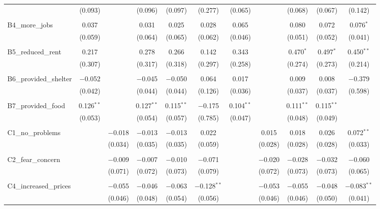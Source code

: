 \begin{table}[H]
\begin{tabular}{@{\extracolsep{4pt}}lcccccccccc}
  & (0.093) &  & (0.096) & (0.097) & (0.277) & (0.065) &  & (0.068) & (0.067) & (0.142) \\ 
  & & & & & & & & & & \\ 
 B4\_more\_jobs & 0.037 &  & 0.031 & 0.025 & 0.028 & 0.065 &  & 0.080 & 0.072 & 0.076$^{*}$ \\ 
  & (0.059) &  & (0.064) & (0.065) & (0.062) & (0.046) &  & (0.051) & (0.052) & (0.041) \\ 
  & & & & & & & & & & \\ 
 B5\_reduced\_rent & 0.217 &  & 0.278 & 0.266 & 0.142 & 0.343 &  & 0.470$^{*}$ & 0.497$^{*}$ & 0.450$^{**}$ \\ 
  & (0.307) &  & (0.317) & (0.318) & (0.297) & (0.258) &  & (0.274) & (0.273) & (0.214) \\ 
  & & & & & & & & & & \\ 
 B6\_provided\_shelter & $-$0.052 &  & $-$0.045 & $-$0.050 & 0.064 & 0.017 &  & 0.009 & 0.008 & $-$0.379 \\ 
  & (0.042) &  & (0.044) & (0.044) & (0.126) & (0.036) &  & (0.037) & (0.037) & (0.598) \\ 
  & & & & & & & & & & \\ 
 B7\_provided\_food & 0.126$^{**}$ &  & 0.127$^{**}$ & 0.115$^{**}$ & $-$0.175 & 0.104$^{**}$ &  & 0.111$^{**}$ & 0.115$^{**}$ &  \\ 
  & (0.053) &  & (0.054) & (0.057) & (0.785) & (0.047) &  & (0.048) & (0.049) &  \\ 
  & & & & & & & & & & \\ 
 C1\_no\_problems &  & $-$0.018 & $-$0.013 & $-$0.013 & 0.022 &  & 0.015 & 0.018 & 0.026 & 0.072$^{**}$ \\ 
  &  & (0.034) & (0.035) & (0.035) & (0.059) &  & (0.028) & (0.028) & (0.028) & (0.033) \\ 
  & & & & & & & & & & \\ 
 C2\_fear\_concern &  & $-$0.009 & $-$0.007 & $-$0.010 & $-$0.071 &  & $-$0.020 & $-$0.028 & $-$0.032 & $-$0.060 \\ 
  &  & (0.071) & (0.072) & (0.073) & (0.079) &  & (0.072) & (0.073) & (0.073) & (0.065) \\ 
  & & & & & & & & & & \\ 
 C4\_increased\_prices &  & $-$0.055 & $-$0.046 & $-$0.063 & $-$0.128$^{**}$ &  & $-$0.053 & $-$0.055 & $-$0.048 & $-$0.083$^{**}$ \\ 
  &  & (0.046) & (0.048) & (0.054) & (0.056) &  & (0.046) & (0.046) & (0.050) & (0.041) \\ 

\end{tabular}
\end{table}

